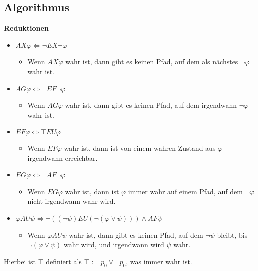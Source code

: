 \documentclass[a4paper,6pt]{article}
\begin{document}
\begin{multicols*}{3}
\subsection*{Algorithmus}

\textbf{Reduktionen}

\begin{itemize}
    \item $AX \varphi \Leftrightarrow \neg EX \neg \varphi$
        \begin{itemize}
            \item \tiny{Wenn $AX \varphi$ wahr ist, dann gibt es keinen Pfad, auf dem als nächstes $\neg \varphi$ wahr ist.}
        \end{itemize}
    \item $AG \varphi \Leftrightarrow \neg EF \neg \varphi$
        \begin{itemize}
            \item \tiny{Wenn $AG \varphi$ wahr ist, dann gibt es keinen Pfad, auf dem irgendwann $\neg \varphi$ wahr ist.}
        \end{itemize}
    \item $EF \varphi \Leftrightarrow \top EU \varphi$
        \begin{itemize}
            \item \tiny{Wenn $EF \varphi$ wahr ist, dann ist von einem wahren Zustand aus $\varphi$ irgendwann erreichbar.}
        \end{itemize}
    \item $EG \varphi \Leftrightarrow \neg AF \neg \varphi$
        \begin{itemize}
            \item \tiny{Wenn $EG \varphi$ wahr ist, dann ist $\varphi$ immer wahr auf einem Pfad, auf dem $\neg \varphi$ nicht irgendwann wahr wird.}
        \end{itemize}
    \item $\varphi AU \psi \Leftrightarrow \neg ((\neg \psi) EU (\neg (\varphi \lor \psi))) \land AF \psi$
        \begin{itemize}
            \item \tiny{Wenn $\varphi AU \psi$ wahr ist, dann gibt es keinen Pfad, auf dem $\neg \psi$ bleibt, bis $\neg (\varphi \lor \psi)$ wahr wird, und irgendwann wird $\psi$ wahr.}
        \end{itemize}
\end{itemize}

Hierbei ist $\top$ definiert als $\top := p_0 \lor \neg p_0$, was immer wahr ist.


\end{multicols*}
\end{document}

